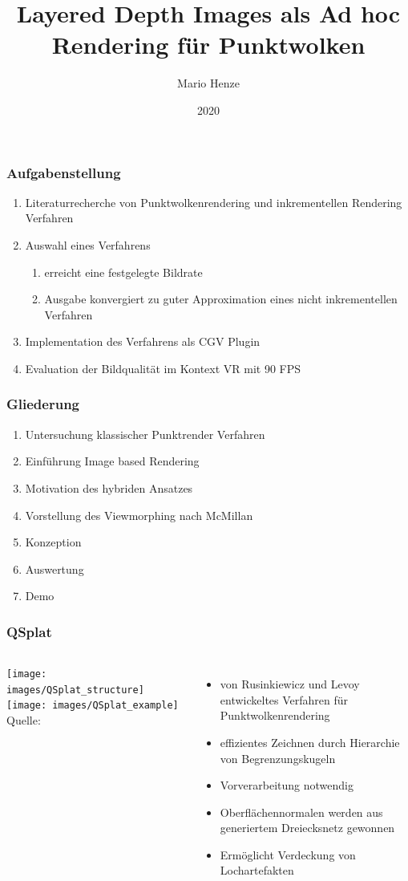 \documentclass[aspectratio=169]{beamer}
\title{Layered Depth Images als Ad hoc Rendering für Punktwolken}
\author{Mario Henze}
\institute{Professur für Computergrafik und Visualisierung}
\date{2020}
\begin{document}
\frame{\titlepage}

\begin{frame}
    \frametitle{Aufgabenstellung}
    \begin{enumerate}
        \item Literaturrecherche von Punktwolkenrendering und inkrementellen Rendering Verfahren
        \item Auswahl eines Verfahrens
        \begin{enumerate}
            \item erreicht eine festgelegte Bildrate
            \item Ausgabe konvergiert zu guter Approximation eines nicht inkrementellen Verfahren
        \end{enumerate}
        \item Implementation des Verfahrens als CGV Plugin
        \item Evaluation der Bildqualität im Kontext VR mit 90 FPS
    \end{enumerate}
\end{frame}

\begin{frame}
    \frametitle{Gliederung}
    \begin{enumerate}
        \item Untersuchung klassischer Punktrender Verfahren
        \item Einführung Image based Rendering
        \item Motivation des hybriden Ansatzes
        \item Vorstellung des Viewmorphing nach McMillan
        \item Konzeption
        \item Auswertung
        \item Demo
    \end{enumerate}
\end{frame}

\begin{frame}
    \frametitle{QSplat}
    \begin{columns}
        \texttt{[image: images/QSplat\_structure]}
        \texttt{[image: images/QSplat\_example]}
        \centering
        \\[-1ex]{\tiny Quelle:~\cite{rusinkiewicz2000qsplat}}

        \begin{itemize}
            \item von Rusinkiewicz und Levoy entwickeltes Verfahren für Punktwolkenrendering
            \item effizientes Zeichnen durch Hierarchie von Begrenzungskugeln
            \item Vorverarbeitung notwendig
            \item Oberflächennormalen werden aus generiertem Dreiecksnetz gewonnen
            \item Ermöglicht Verdeckung von Lochartefakten
        \end{itemize}
    \end{columns}
\end{frame}
\end{document}
